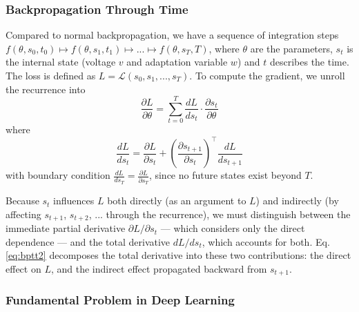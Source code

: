 \subsubsection{Backpropagation Through Time}\label{sec:bg:sg:bptt}
Compared to normal backpropagation, we have a sequence of integration steps $f(\theta, s_0, t_0) \mapsto f(\theta, s_1, t_1) \mapsto ... \mapsto f(\theta, s_T, T)$,
where $\theta$ are the parameters, $s_t$ is the internal state (voltage $v$ and adaptation variable $w$) and $t$ describes the time.
The loss is defined as $L = \mathcal{L}(s_0, s_1, ..., s_T)$. To compute the gradient, we unroll the recurrence into
\begin{equation}
  \frac{\partial L}{\partial \theta} = \sum_{t=0}^{T} \frac{d L}{d s_t} \cdot \frac{\partial s_t}{\partial \theta}
  \label{eq:bptt}
\end{equation}
where
\begin{equation}
  \frac{dL}{ds_t} = \frac{\partial L}{\partial s_t} + \left(\frac{\partial s_{t+1}}{\partial s_t}\right)^\top \frac{dL}{ds_{t+1}}
  \label{eq:bptt2}
\end{equation}
with boundary condition $\frac{dL}{ds_T} = \frac{\partial L}{\partial s_T}$, since no future states exist beyond $T$.

Because $s_t$ influences $L$ both directly (as an argument to $L$) and indirectly (by affecting $s_{t+1}$, $s_{t+2}$, ... through the recurrence),
we must distinguish between the immediate partial derivative $\partial L/\partial s_t$ — which considers only the direct dependence — and the total derivative $dL/ds_t$, which accounts for both.
Eq. \ref{eq:bptt2} decomposes the total derivative into these two contributions:
the direct effect on $L$, and the indirect effect propagated backward from $s_{t+1}$.

\subsubsection{Fundamental Problem in Deep Learning}\label{sec:bg:sg:vanishing-gradients}

